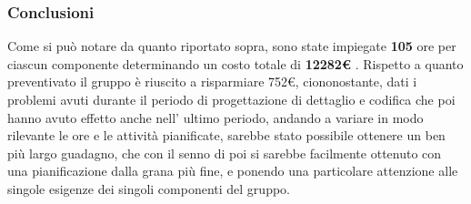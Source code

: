 \subsubsection{Conclusioni}
Come si può notare da quanto riportato sopra, sono state impiegate \textbf{105} ore per ciascun componente determinando un costo totale di \textbf{12282\euro} . Rispetto a quanto preventivato il gruppo è riuscito a risparmiare 752\euro , ciononostante, dati i problemi avuti durante il periodo di progettazione di dettaglio e codifica che poi hanno avuto effetto anche nell' ultimo periodo, andando a variare in modo rilevante le ore e le attività pianificate, sarebbe stato possibile ottenere un ben più largo guadagno, che con il senno di poi si sarebbe facilmente ottenuto con una pianificazione dalla grana più fine, e ponendo una particolare attenzione alle singole esigenze dei singoli componenti del gruppo.